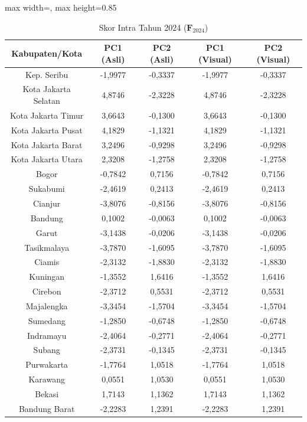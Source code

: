 \begin{table}[H]
\centering
\caption{Skor Intra Tahun 2024 ($\mathbf{F}_{2024}$)} \label{tab:app1skor_intra_2024}
\begin{adjustbox}{max width=\textwidth, max height=0.85\textheight}
\begin{tabular}{|c|c|c|c|c|}
\hline
\textbf{Kabupaten/Kota} & \textbf{PC1 (Asli)} & \textbf{PC2 (Asli)} & \textbf{PC1 (Visual)} & \textbf{PC2 (Visual)} \\
\hline
Kep. Seribu & -1,9977 & -0,3337 & -1,9977 & -0,3337 \\
Kota Jakarta Selatan & 4,8746 & -2,3228 & 4,8746 & -2,3228 \\
Kota Jakarta Timur & 3,6643 & -0,1300 & 3,6643 & -0,1300 \\
Kota Jakarta Pusat & 4,1829 & -1,1321 & 4,1829 & -1,1321 \\
Kota Jakarta Barat & 3,2496 & -0,9298 & 3,2496 & -0,9298 \\
Kota Jakarta Utara & 2,3208 & -1,2758 & 2,3208 & -1,2758 \\
Bogor & -0,7842 & 0,7156 & -0,7842 & 0,7156 \\
Sukabumi & -2,4619 & 0,2413 & -2,4619 & 0,2413 \\
Cianjur & -3,8076 & -0,8156 & -3,8076 & -0,8156 \\
Bandung & 0,1002 & -0,0063 & 0,1002 & -0,0063 \\
Garut & -3,1438 & -0,0206 & -3,1438 & -0,0206 \\
Tasikmalaya & -3,7870 & -1,6095 & -3,7870 & -1,6095 \\
Ciamis & -2,3132 & -1,8830 & -2,3132 & -1,8830 \\
Kuningan & -1,3552 & 1,6416 & -1,3552 & 1,6416 \\
Cirebon & -2,3712 & 0,5531 & -2,3712 & 0,5531 \\
Majalengka & -3,3454 & -1,5704 & -3,3454 & -1,5704 \\
Sumedang & -1,2850 & -0,6748 & -1,2850 & -0,6748 \\
Indramayu & -2,4064 & -0,2771 & -2,4064 & -0,2771 \\
Subang & -2,3731 & -0,1345 & -2,3731 & -0,1345 \\
Purwakarta & -1,7764 & 1,0518 & -1,7764 & 1,0518 \\
Karawang & 0,0551 & 1,0530 & 0,0551 & 1,0530 \\
Bekasi & 1,7143 & 1,1362 & 1,7143 & 1,1362 \\
Bandung Barat & -2,2283 & 1,2391 & -2,2283 & 1,2391 \\

\end{tabular}
\end{adjustbox}
\end{table}
